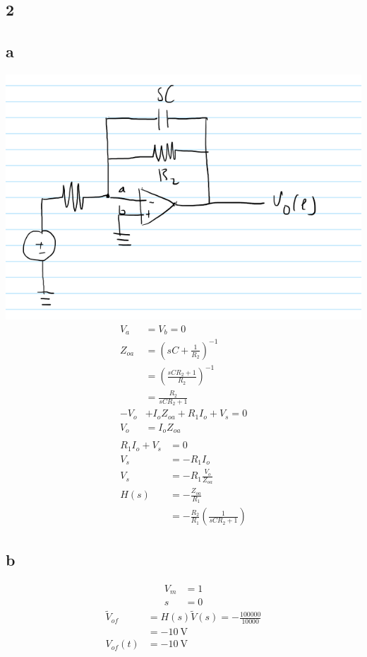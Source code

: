\documentclass{article}
\begin{document}
\begin{multicols}{2}
\section*{2}
\subsection*{a}
\includegraphics[scale=0.5]{PS7cct.png}
\begin{align*}
V_a &= V_b = 0\\
Z_{oa} &= \left( sC + \frac{1}{R_2}\right)^{-1}\\
&= \left( \frac{sCR_2 + 1}{R_2}\right)^{-1}\\
&= \frac{R_2}{sCR_2+1}\\
-V_o &+ I_o Z_{oa} + R_1 I_o + V_s = 0\\
V_o &= I_o Z_{oa}\\
\end{align*}
\begin{align*}
    R_1 I_o + V_s &= 0\\
    V_s &= -R_1 I_o\\
    V_s &= -R_1 \frac{V_o}{Z_{oa}}\\
    H(s) &= -\frac{Z_{oa}}{R_1}\\
    &= -\frac{R_2}{R_1}\left(\frac{1}{sCR_2 + 1}\right)
\end{align*}
\subsection*{b}
\begin{align*}
V_m &= 1\\
s &= 0
\end{align*}
\begin{align*}
    \tilde{V}_{of} &= H(s) \tilde{V}(s) = -\frac{100000}{10000}\\
    &= -\SI{10}{\volt}\\
    V_{of}(t) &= -\SI{10}{\volt}\\
\end{align*}

\end{multicols}
\end{document}
